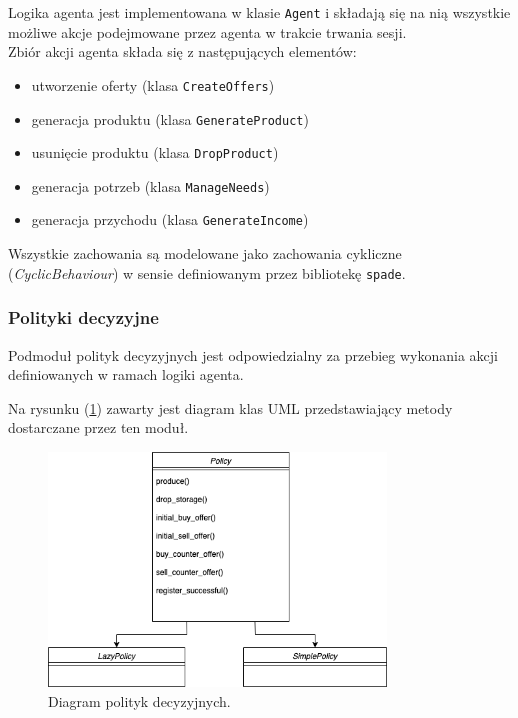 \documentclass{article}
\begin{document}
Logika agenta jest implementowana w klasie \texttt{Agent} i składają się na nią wszystkie możliwe akcje podejmowane przez agenta w trakcie trwania sesji. \\
Zbiór akcji agenta składa się z następujących elementów:

\begin{itemize}

	\item utworzenie oferty (klasa \texttt{CreateOffers})
	\item generacja produktu (klasa \texttt{GenerateProduct})
	\item usunięcie produktu (klasa \texttt{DropProduct}) 
	\item generacja potrzeb (klasa \texttt{ManageNeeds})
	\item generacja przychodu (klasa \texttt{GenerateIncome})
\end{itemize}

Wszystkie zachowania są modelowane jako zachowania cykliczne (\textit{CyclicBehaviour}) w sensie definiowanym przez bibliotekę \texttt{spade}.

\subsubsection{Polityki decyzyjne}

Podmoduł polityk decyzyjnych jest odpowiedzialny za przebieg wykonania akcji definiowanych w ramach logiki agenta.

Na rysunku (\ref{fig:uml-policy}) zawarty jest diagram 
klas UML przedstawiający metody dostarczane przez ten moduł.

\begin{figure}[H]
	\centering
	\includegraphics[width=0.8\textwidth, height=0.3\textheight]{./policy.png}
	\caption{Diagram polityk decyzyjnych.}
	\label{fig:uml-policy}
\end{figure}
\end{document}
